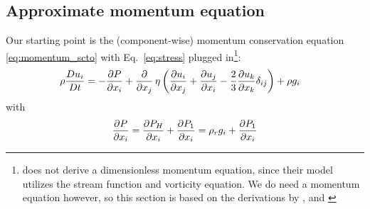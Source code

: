 \documentclass[a4paper]{article}
\newcommand{\mdv}[2]{\frac{D #1}{D #2}}
\begin{document}
\subsection{Approximate momentum equation} \label{section:momentum_eq}

Our starting point is the (component-wise) momentum conservation equation \eqref{eq:momentum_scto} with Eq.~\eqref{eq:stress} plugged in\footnote{\textcite{jamc80} does not derive a dimensionless
momentum equation, since their model utilizes the stream function and vorticity equation. We do need a momentum equation however, so this section is based on the derivations 
by \textcite{scto01}, \textcite{itki94} and \textcite{rica07}}:
\begin{align*}
    \rho\mdv{u_i}{t} &= -\pdv{P}{x_i} + \pdv{x_j}\, \eta \left( \pdv{u_i}{x_j} + \pdv{u_j}{x_i} -\frac{2}{3}\pdv{u_k}{x_k}\delta_{ij}\right)  + \rho g_i
\end{align*}
with
\begin{align*}
    \pdv{P}{x_i} = \pdv{P_H}{x_i} + \pdv{P_1}{x_i} = \rho_rg_i + \pdv{P_1}{x_i}
\end{align*}
\end{document}
